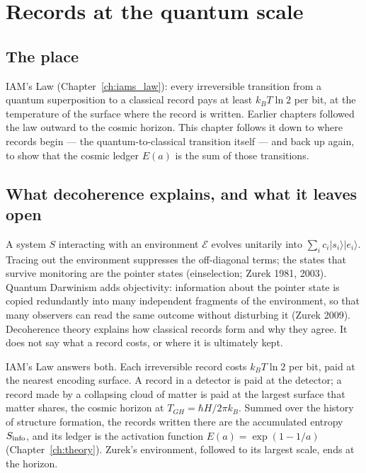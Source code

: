 \chapter{Records at the quantum scale}\label{ch:quantumrecords}

\section*{The place}
IAM's Law (Chapter~\ref{ch:iams_law}): every irreversible transition from a quantum superposition to a classical record pays at least $k_BT\ln2$ per bit,
at the temperature of the surface where the record is written. Earlier chapters followed the law outward to the cosmic horizon. This chapter follows it
down to where records begin --- the quantum-to-classical transition itself --- and back up again, to show that the cosmic ledger $E(a)$ is the sum of
those transitions.

\section{What decoherence explains, and what it leaves open}
A system $S$ interacting with an environment $\mathcal E$ evolves unitarily into $\sum_i c_i|s_i\rangle|e_i\rangle$. Tracing out the environment
suppresses the off-diagonal terms; the states that survive monitoring are the pointer states (einselection; Zurek 1981, 2003). Quantum Darwinism adds
objectivity: information about the pointer state is copied redundantly into many independent fragments of the environment, so that many observers can
read the same outcome without disturbing it (Zurek 2009). Decoherence theory explains how classical records form and why they agree. It does not say
what a record costs, or where it is ultimately kept.

IAM's Law answers both. Each irreversible record costs $k_BT\ln2$ per bit, paid at the nearest encoding surface. A record in a detector is paid at the
detector; a record made by a collapsing cloud of matter is paid at the largest surface that matter shares, the cosmic horizon at
$T_{GH}=\hbar H/2\pi k_B$. Summed over the history of structure formation, the records written there are the accumulated entropy $S_{\rm info}$, and its
ledger is the activation function $E(a)=\exp(1-1/a)$ (Chapter~\ref{ch:theory}). Zurek's environment, followed to its largest scale, ends at the horizon.

